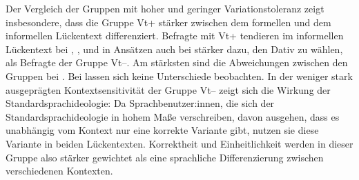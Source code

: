 Der Vergleich der Gruppen mit hoher und geringer Variationstoleranz zeigt insbesondere, dass die Gruppe Vt+ stärker zwischen dem formellen und dem informellen Lückentext differenziert. 
Befragte mit Vt+ tendieren im informellen Lückentext bei \wegen, \waehrend, \dank{} und in Ansätzen auch bei  stärker dazu, den Dativ zu wählen, als Befragte der Gruppe Vt--. 
Am stärksten sind die Abweichungen zwischen den Gruppen bei \wegen. 
Bei \gegenueber{} lassen sich keine Unterschiede beobachten. 
In der weniger stark ausgeprägten Kontextsensitivität der Gruppe Vt-- zeigt sich die Wirkung der Standardsprachideologie: 
Da Sprachbenutzer:innen, die sich der Standardsprachideologie in hohem Maße verschreiben, davon ausgehen, dass es unabhängig vom Kontext nur eine korrekte Variante gibt, nutzen sie diese Variante in beiden Lückentexten. 
Korrektheit und Einheitlichkeit werden in dieser Gruppe also stärker gewichtet als eine sprachliche Differenzierung zwischen verschiedenen Kontexten.  
